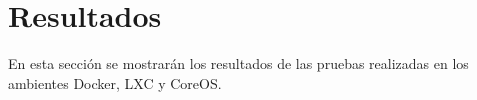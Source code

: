 \section{Resultados}
En esta sección se mostrarán los resultados de las pruebas realizadas en los ambientes Docker, LXC y CoreOS.
